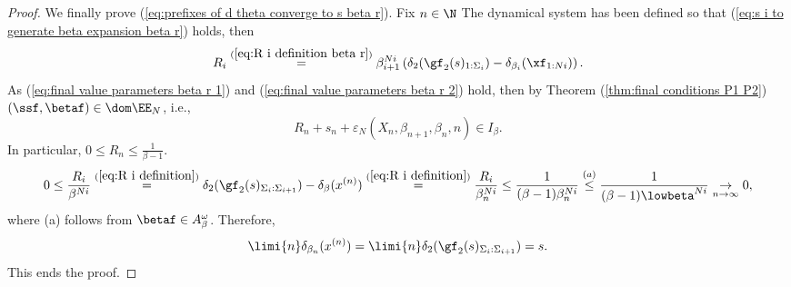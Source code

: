 \begin{proof}
	We finally prove (\ref{eq:prefixes of d theta converge to s beta r}). Fix $n \in \N$ The dynamical system has been defined so that (\ref{eq:s i to generate beta expansion beta r}) holds, then
	\begin{equation}
		R_i \overset{(\ref{eq:R i definition beta r})}{=} \beta_{i+1}^{Ni}\left(\delta_2(\gf_2(s)_{1:\Sigma_{i}}) - \delta_{\beta_{i}}(\xf_{1:Ni})\right).
	\end{equation}
	As (\ref{eq:final value parameters beta r 1}) and (\ref{eq:final value parameters beta r 2}) hold, then by Theorem (\ref{thm:final conditions P1 P2}) $(\ssf, \betaf) \in \dom \EE_N$, i.e.,
	\begin{equation}R_n + s_n + \varepsilon_N(X_n, \beta_{n+1}, \beta_n, n) \in I_\beta.\end{equation}
	In particular, $0 \leq R_n \leq \frac{1}{\beta-1}$.
	\begin{equation}
		0 \leq \frac{R_i}{\beta^{Ni}} \overset{(\ref{eq:R i definition})}{=} \delta_2(\gf_2(s)_{\Sigma_i:\Sigma_{i+1}}) - \delta_\beta(x^{(n)})  \overset{(\ref{eq:R i definition})}{=} \frac{R_i}{\beta_n^{Ni}} \leq \frac{1}{(\beta-1) \beta_n^{Ni}} \overset{(a)}{\leq} \frac{1}{(\beta-1) \lowbeta^{Ni}}\underset{n \to \infty}{\to} 0,
	\end{equation}
	where (a) follows from $\betaf \in A_\beta^\omega$. Therefore,
	\begin{equation}
		\limi{n} \delta_{\beta_n}(x^{(n)}) = \limi{n} \delta_2(\gf_2(s)_{\Sigma_i:\Sigma_{i+1}}) = s.
	\end{equation}
	This ends the proof.
		

\end{proof}
